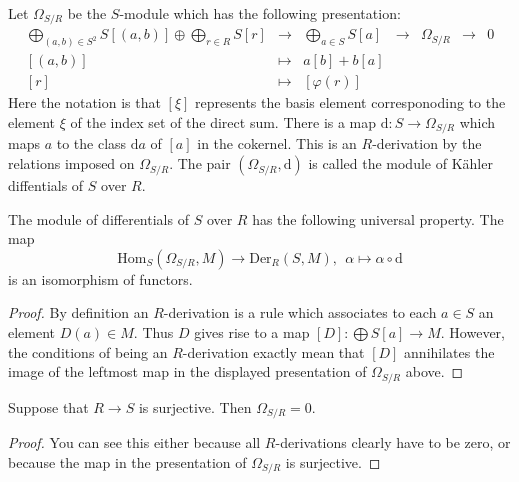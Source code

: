 \medskip\noindent
Let $\Omega_{S/R}$ be the $S$-module which has the
following presentation:
$$
\begin{matrix}
\bigoplus_{(a, b)\in S^2} S[(a, b)] \oplus \bigoplus_{r\in R} S[r]
&
\to
&
\bigoplus_{a\in S} S [a]
&
\to
&
\Omega_{S/R}
&
\to
&
0
\\
[(a, b)]
&
\mapsto
&
a[b] + b[a]
&
&
&
&
\\
[r]
&
\mapsto
&
[\varphi(r)]
&
&
&
&
\end{matrix}
$$
Here the notation is that $[\xi]$ represents the basis
element corresponoding to the element $\xi$ of the index set
of the direct sum. There is a map $\text{d} : S \to \Omega_{S/R}$
which maps $a$ to the class $\text{d}a$ of $[a]$ in the cokernel.
This is an $R$-derivation by the relations imposed on $\Omega_{S/R}$.
The pair $(\Omega_{S/R}, \text{d})$ is called the module
of K\"ahler diffentials of $S$ over $R$.

\begin{lemma}
\label{lemma-universal-omega}
The module of differentials of $S$ over $R$ has the following
universal property. The map
$$
\text{Hom}_S(\Omega_{S/R}, M)
\longrightarrow
\text{Der}_R(S, M), \ \ 
\alpha
\longmapsto
\alpha \circ \text{d}
$$
is an isomorphism of functors.
\end{lemma}

\begin{proof}
By definition an $R$-derivation is a rule which associates
to each $a \in S$ an element $D(a) \in M$. Thus $D$ gives
rise to a map $[D] : \bigoplus S[a] \to M$. However, the conditions
of being an $R$-derivation exactly mean that $[D]$ annihilates
the image of the leftmost map in the displayed presentation of
$\Omega_{S/R}$ above.
\end{proof}

\begin{lemma}
\label{lemma-trivial-differential-surjective}
Suppose that $R \to S$ is surjective.
Then $\Omega_{S/R} = 0$.
\end{lemma}

\begin{proof}
You can see this either because all $R$-derivations
clearly have to be zero, or because
the map in the presentation of $\Omega_{S/R}$ is surjective.
\end{proof}


